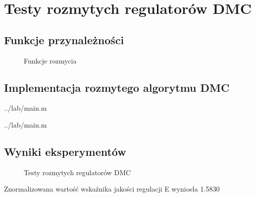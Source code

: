 \section{Testy rozmytych regulatorów DMC}
\label{lab:zad5}


\subsection{Funkcje przynależności}
\label{lab:zad5:fuzzyFunction}

\begin{figure}[H] 
    \centering
    
    \caption{Funkcje rozmycia}
    \label{lab:zad5:fuzzyFunction:figure}
 \end{figure}

\newpage

\subsection{Implementacja rozmytego algorytmu DMC}
\label{lab:zad5:implDMC}


    {../lab/main.m}


    {../lab/main.m}

\newpage


\subsection{Wyniki eksperymentów}
\label{lab:zad5:eksperymenty}

\begin{figure}[H] 
   \centering
   
   \caption{Testy rozmytych regulatorów DMC}
   \label{lab:zad5:eksperymenty:figure}
\end{figure}

Znormalizowana wartość wskaźnika jakości regulacji E wyniosła \num{1.5830}

\newpage
